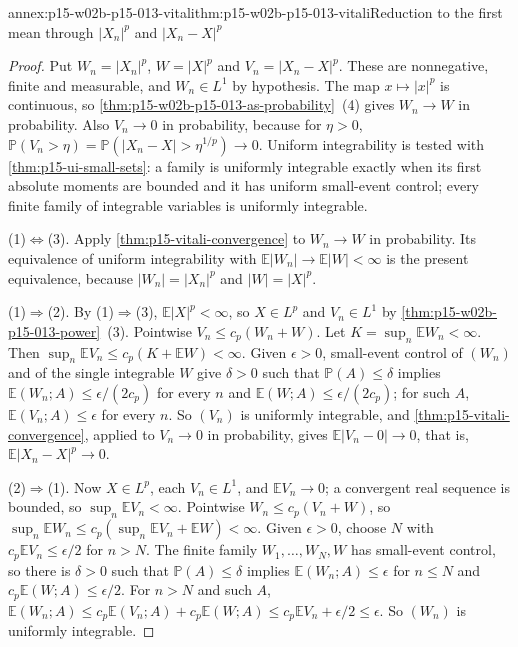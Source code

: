 \begin{annexitem}{annex:p15-w02b-p15-013-vitali}{thm:p15-w02b-p15-013-vitali}{Reduction to the first mean through \(|X_n|^p\) and \(|X_n-X|^p\)}
\begin{proof}
Put \(W_n=|X_n|^p\), \(W=|X|^p\) and \(V_n=|X_n-X|^p\). These are
nonnegative, finite and measurable, and \(W_n\in L^1\) by hypothesis.
The map \(x\mapsto|x|^p\) is continuous, so
\cref{thm:p15-w02b-p15-013-as-probability}~(4) gives \(W_n\to W\) in
probability. Also \(V_n\to0\) in probability, because for \(\eta>0\),
\(\mathbb P(V_n>\eta)=\mathbb P(|X_n-X|>\eta^{1/p})\to0\). Uniform
integrability is tested with \cref{thm:p15-ui-small-sets}: a family is
uniformly integrable exactly when its first absolute moments are
bounded and it has uniform small-event control; every finite family of
integrable variables is uniformly integrable.

(1)\(\Leftrightarrow\)(3). Apply \cref{thm:p15-vitali-convergence} to
\(W_n\to W\) in probability. Its equivalence of uniform integrability
with \(\mathbb E|W_n|\to\mathbb E|W|<\infty\) is the present
equivalence, because \(|W_n|=|X_n|^p\) and \(|W|=|X|^p\).

(1)\(\Rightarrow\)(2). By (1)\(\Rightarrow\)(3),
\(\mathbb E|X|^p<\infty\), so \(X\in L^p\) and \(V_n\in L^1\) by
\cref{thm:p15-w02b-p15-013-power}~(3). Pointwise
\(V_n\leq c_p(W_n+W)\). Let \(K=\sup_n\mathbb EW_n<\infty\). Then
\(\sup_n\mathbb EV_n\leq c_p(K+\mathbb EW)<\infty\). Given
\(\epsilon>0\), small-event control of \((W_n)\) and of the single
integrable \(W\) give \(\delta>0\) such that \(\mathbb P(A)\leq\delta\)
implies \(\mathbb E(W_n;A)\leq\epsilon/(2c_p)\) for every \(n\) and
\(\mathbb E(W;A)\leq\epsilon/(2c_p)\); for such \(A\),
\(\mathbb E(V_n;A)\leq\epsilon\) for every \(n\). So \((V_n)\) is
uniformly integrable, and \cref{thm:p15-vitali-convergence}, applied to
\(V_n\to0\) in probability, gives \(\mathbb E|V_n-0|\to0\), that is,
\(\mathbb E|X_n-X|^p\to0\).

(2)\(\Rightarrow\)(1). Now \(X\in L^p\), each \(V_n\in L^1\), and
\(\mathbb EV_n\to0\); a convergent real sequence is bounded, so
\(\sup_n\mathbb EV_n<\infty\). Pointwise \(W_n\leq c_p(V_n+W)\), so
\(\sup_n\mathbb EW_n\leq c_p(\sup_n\mathbb EV_n+\mathbb EW)<\infty\).
Given \(\epsilon>0\), choose \(N\) with \(c_p\mathbb EV_n\leq\epsilon/2\)
for \(n>N\). The finite family \(W_1,\ldots,W_N,W\) has small-event
control, so there is \(\delta>0\) such that \(\mathbb P(A)\leq\delta\)
implies \(\mathbb E(W_n;A)\leq\epsilon\) for \(n\leq N\) and
\(c_p\mathbb E(W;A)\leq\epsilon/2\). For \(n>N\) and such \(A\),
\(\mathbb E(W_n;A)\leq c_p\mathbb E(V_n;A)+c_p\mathbb E(W;A)\leq
c_p\mathbb EV_n+\epsilon/2\leq\epsilon\). So \((W_n)\) is uniformly
integrable.


\end{proof}
\end{annexitem}

